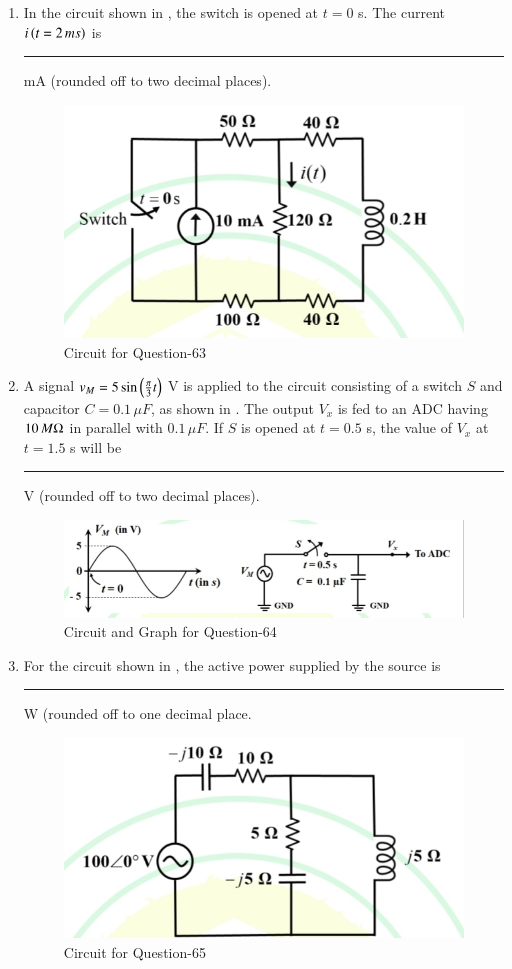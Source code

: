 \documentclass[journal,12pt,onecolumn]{IEEEtran}
\theoremstyle{remark}
\begin{document}
\begin{enumerate}
\item In the circuit shown in , the switch is opened at $t=0$ s. The current $i\left(t=2\,ms\right)$ is \rule{1.5cm}{0.4pt} mA (rounded off to two decimal places). \par\hfill{}
\begin{figure}[H]
\centering
\includegraphics[width=0.6\columnwidth]{Figs/Q-63.jpg}
\caption{Circuit for Question-63}
\label{63}
\end{figure}


\item A signal $v_M=5\sin\left(\frac{\pi}{3}t\right)$ V is applied to the circuit consisting of a switch $S$ and capacitor $C=0.1\,\mu F$, as shown in . The output $V_x$ is fed to an ADC having $10\,M\ohm$ in parallel with $0.1\,\mu F$. If $S$ is opened at $t=0.5$ s, the value of $V_x$ at $t=1.5$ s will be \rule{1.5cm}{0.4pt} V (rounded off to two decimal places). \par\hfill{}
\begin{figure}[H]
\centering
\includegraphics[width=0.8\columnwidth]{Figs/Q-64.jpg}
\caption{Circuit and Graph for Question-64}
\label{64}
\end{figure}


\item For the circuit shown in , the active power supplied by the source is \rule{1.5cm}{0.4pt} W (rounded off to one decimal place.
\par\hfill{}
\begin{figure}[H]
\centering
\includegraphics[width=0.5\columnwidth]{Figs/Q-65.jpg}
\caption{Circuit for Question-65}
\label{65}
\end{figure}

\end{enumerate}
\end{document}
